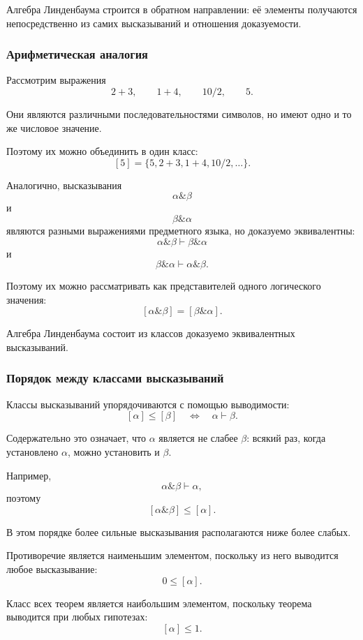 \documentclass[12pt,a4paper,oneside,openany]{book}
\theoremstyle{definition}
\theoremstyle{plain}
\theoremstyle{remark}
\begin{document}
Алгебра Линденбаума строится в обратном направлении: её элементы
получаются непосредственно из самих высказываний и отношения
доказуемости.

\subsubsection{Арифметическая аналогия}

Рассмотрим выражения
\[
2+3,
\qquad
1+4,
\qquad
10/2,
\qquad
5.
\]

Они являются различными последовательностями символов, но имеют одно
и то же числовое значение.

Поэтому их можно объединить в один класс:
\[
[5]
=
\{5,2+3,1+4,10/2,\ldots\}.
\]

Аналогично, высказывания
\[
\alpha\mathbin{\&}\beta
\]
и
\[
\beta\mathbin{\&}\alpha
\]
являются разными выражениями предметного языка, но доказуемо
эквивалентны:
\[
\alpha\mathbin{\&}\beta
\vdash
\beta\mathbin{\&}\alpha
\]
и
\[
\beta\mathbin{\&}\alpha
\vdash
\alpha\mathbin{\&}\beta.
\]

Поэтому их можно рассматривать как представителей одного логического
значения:
\[
[\alpha\mathbin{\&}\beta]
=
[\beta\mathbin{\&}\alpha].
\]

Алгебра Линденбаума состоит из классов доказуемо эквивалентных
высказываний.

\subsubsection{Порядок между классами высказываний}

Классы высказываний упорядочиваются с помощью выводимости:
\[
[\alpha]\leq[\beta]
\quad\Longleftrightarrow\quad
\alpha\vdash\beta.
\]

Содержательно это означает, что \(\alpha\) является не слабее
\(\beta\): всякий раз, когда установлено \(\alpha\), можно установить
и \(\beta\).

Например,
\[
\alpha\mathbin{\&}\beta
\vdash\alpha,
\]
поэтому
\[
[\alpha\mathbin{\&}\beta]
\leq
[\alpha].
\]

В этом порядке более сильные высказывания располагаются ниже более
слабых.

Противоречие является наименьшим элементом, поскольку из него
выводится любое высказывание:
\[
0\leq[\alpha].
\]

Класс всех теорем является наибольшим элементом, поскольку теорема
выводится при любых гипотезах:
\[
[\alpha]\leq1.
\]
\end{document}
